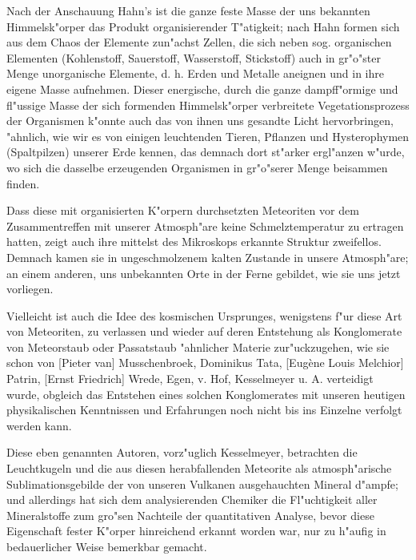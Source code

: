 \documentclass[a4paper, 11pt, oneside]{article}
\begin{document}
Nach der Anschauung Hahn's ist die ganze feste Masse der uns bekannten Himmelsk"orper das Produkt organisierender T"atigkeit; nach Hahn formen sich aus dem Chaos der Elemente zun"achst Zellen, die sich neben sog. organischen Elementen (Kohlenstoff, Sauerstoff, Wasserstoff, Stickstoff) auch in gr"o"ster Menge unorganische Elemente, d. h. Erden und Metalle aneignen und in ihre eigene Masse aufnehmen. Dieser energische, durch die ganze dampff"ormige und fl"ussige Masse der sich formenden Himmelsk"orper verbreitete Vegetationsprozess der Organismen k"onnte auch das von ihnen uns gesandte Licht hervorbringen, "ahnlich, wie wir es von einigen leuchtenden Tieren, Pflanzen und Hysterophymen (Spaltpilzen) unserer Erde kennen, das demnach dort st"arker ergl"anzen w"urde, wo sich die dasselbe erzeugenden Organismen in gr"o"serer Menge beisammen finden.

Dass diese mit organisierten K"orpern durchsetzten Meteoriten vor dem Zusammentreffen mit unserer Atmosph"are keine Schmelztemperatur zu ertragen hatten, zeigt auch ihre mittelst des Mikroskops erkannte Struktur zweifellos. Demnach kamen sie in ungeschmolzenem kalten Zustande in unsere Atmosph"are; an einem anderen, uns unbekannten Orte in der Ferne gebildet, wie sie uns jetzt vorliegen.

Vielleicht ist auch die Idee des kosmischen Ursprunges, wenigstens f"ur diese Art von Meteoriten, zu verlassen und wieder auf deren Entstehung als Konglomerate von Meteorstaub oder Passatstaub "ahnlicher Materie zur"uckzugehen, wie sie schon von [Pieter van] Musschenbroek, Dominikus Tata, [Eugène Louis Melchior] Patrin, [Ernst Friedrich] Wrede, Egen, v. Hof, Kesselmeyer u. A. verteidigt wurde, obgleich das Entstehen eines solchen Konglomerates mit unseren heutigen physikalischen Kenntnissen und Erfahrungen noch nicht bis ins Einzelne verfolgt werden kann.

Diese eben genannten Autoren, vorz"uglich Kesselmeyer, betrachten die Leuchtkugeln und die aus diesen herabfallenden Meteorite als atmosph"arische Sublimationsgebilde der von unseren Vulkanen ausgehauchten Mineral d"ampfe; und allerdings hat sich dem analysierenden Chemiker die Fl"uchtigkeit aller Mineralstoffe zum gro"sen Nachteile der quantitativen Analyse, bevor diese Eigenschaft fester K"orper hinreichend erkannt worden war, nur zu h"aufig in bedauerlicher Weise bemerkbar gemacht.
\end{document}
